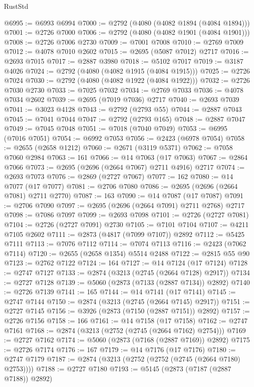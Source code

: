 \begin{lexlean}{RustStd}
\begin{coremodule}
@6995 := @6993 @6994
@7000 := @2792 (@4080 (@4082 @1894 (@4084 @1894)))
@7001 := @2726 @7000
@7006 := @2792 (@4080 (@4082 @1901 (@4084 @1901)))
@7008 := @2726 @7006 @2730
@7009 := @7001 @7008
@7010 := @2769 @7009
@7012 := @4078 @7010 @2602
@7015 := @2695 (@5087 @7012) @2717
@7016 := @2693 @7015
@7017 := @2887 @3980
@7018 := @5102 @7017
@7019 := @3187 @4026
@7024 := @2792 (@4080 (@4082 @1915 (@4084 @1915)))
@7025 := @2726 @7024
@7030 := @2792 (@4080 (@4082 @1922 (@4084 @1922)))
@7032 := @2726 @7030 @2730
@7033 := @7025 @7032
@7034 := @2769 @7033
@7036 := @4078 @7034 @2602
@7039 := @2695 (@7019 @7036) @2717
@7040 := @2693 @7039
@7041 := @3023 @4128
@7043 := @2792 (@2793 @55)
@7044 := @2887 @7043
@7045 := @7041 @7044
@7047 := @2792 (@2793 @165)
@7048 := @2887 @7047
@7049 := @7045 @7048
@7051 := @7018 (@7040 @7049)
@7053 := @6995 (@7016 @7051)
@7054 := @6992 @7053
@7056 := @2423 (@6978 @7054)
@7058 := @2655 (@2658 @1212)
@7060 := @2671 (@3119 @5371)
@7062 := @7058 @7060 @2984
@7063 := 161
@7066 := @14 @7063 (@17 @7063)
@7067 := @2864 @7066
@7073 := @2695 (@2696 (@2664 @7067) @2711 @4916) @2717
@7074 := @2693 @7073
@7076 := @2869 (@2727 @7067)
@7077 := 162
@7080 := @14 @7077 (@17 @7077)
@7081 := @2706 @7080
@7086 := @2695 (@2696 (@2664 @7081) @2711 @2770)
@7087 := 163
@7090 := @14 @7087 (@17 @7087)
@7091 := @2706 @7090
@7097 := @2695 (@2696 (@2664 @7091) @2711 @2768) @2717
@7098 := @7086 @7097
@7099 := @2693 @7098
@7101 := @2726 (@2727 @7081)
@7104 := @2726 (@2727 @7091) @2730
@7105 := @7101 @7104
@7107 := @4211 @7105 @2602
@7111 := @2873 (@4817 (@7099 @7107)) @2892
@7112 := @5425 @7111
@7113 := @7076 @7112
@7114 := @7074 @7113
@7116 := @2423 (@7062 @7114)
@7120 := @2655 (@2658 @1354) @5514 @2488
@7122 := @2815 @55 @90
@7123 := @2762 @7122
@7124 := 164
@7127 := @14 @7124 (@17 @7124)
@7128 := @2747 @7127
@7133 := @2874 (@3213 (@2745 (@2664 @7128) @2917))
@7134 := @2727 @7128
@7139 := @5060 (@2873 (@7133 (@2887 @7134)) @2892)
@7140 := @2726 @7139
@7141 := 165
@7144 := @14 @7141 (@17 @7141)
@7145 := @2747 @7144
@7150 := @2874 (@3213 (@2745 (@2664 @7145) @2917))
@7151 := @2727 @7145
@7156 := @3926 (@2873 (@7150 (@2887 @7151)) @2892)
@7157 := @2726 @7156
@7158 := 166
@7161 := @14 @7158 (@17 @7158)
@7162 := @2747 @7161
@7168 := @2874 (@3213 (@2752 (@2745 (@2664 @7162) @2754)))
@7169 := @2727 @7162
@7174 := @5060 (@2873 (@7168 (@2887 @7169)) @2892)
@7175 := @2726 @7174
@7176 := 167
@7179 := @14 @7176 (@17 @7176)
@7180 := @2747 @7179
@7187 := @2874 (@3213 (@2752 (@2752 (@2745 (@2664 @7180) @2753))))
@7188 := @2727 @7180
@7193 := @5145 (@2873 (@7187 (@2887 @7188)) @2892)

\end{coremodule}
\end{lexlean}
